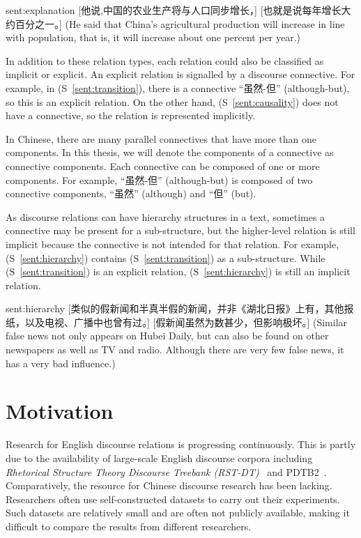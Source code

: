 \begin{sent}{sent:explanation}{}
    [他说,中国的农业生产将与人口同步增长，] [也就是说每年增长大约百分之一。]
    (He said that China's agricultural production will increase in line with
    population, that is, it will increase about one percent per year.)
\end{sent}

In addition to these relation types, each relation could also be classified
as implicit or explicit. An explicit relation is signalled by a discourse connective.
For example, in (S~\ref{sent:transition}), there is a connective ``虽然-但''
(although-but), so this is an explicit relation. On the other hand,
(S~\ref{sent:causality}) does not have a connective, so the relation
is represented implicitly.

In Chinese, there are many parallel connectives that have more than one components.
In this thesis, we will denote the components of a connective as connective components.
Each connective can be composed of one or more components. For example, ``虽然-但''
(although-but) is composed of two connective components, ``虽然'' (although)
and ``但'' (but).

As discourse relations can have hierarchy structures in a text, sometimes
a connective may be present for a sub-structure, but the higher-level relation
is still implicit because the connective is not intended for that relation.
For example, (S~\ref{sent:hierarchy}) contains (S~\ref{sent:transition})
as a sub-structure. While (S~\ref{sent:transition}) is an explicit relation,
(S~\ref{sent:hierarchy}) is still an implicit relation.

\begin{sent}{sent:hierarchy}{}
    [类似的假新闻和半真半假的新闻，并非《湖北日报》上有，其他报纸，以及电视、广播中也曾有过。]
    [假新闻虽然为数甚少，但影响极坏。]
    (Similar false news not only appears on Hubei Daily, but can also be found on
    other newspapers as well as TV and radio.
    Although there are very few false news, it has a very bad influence.)
\end{sent}



%
%
\section{Motivation}

Research for English discourse relations is progressing continuously. This is partly
due to the availability of large-scale English discourse corpora including
\textit{Rhetorical Structure Theory Discourse Treebank (RST-DT)}~\citep{Carlson01building} and
PDTB2~\citep{Prasad08thepenn}. Comparatively, the resource for Chinese discourse research
has been lacking. Researchers often use self-constructed datasets to carry out their experiments.
Such datasets are relatively small and are often not publicly available, making it difficult to compare
the results from different researchers.

